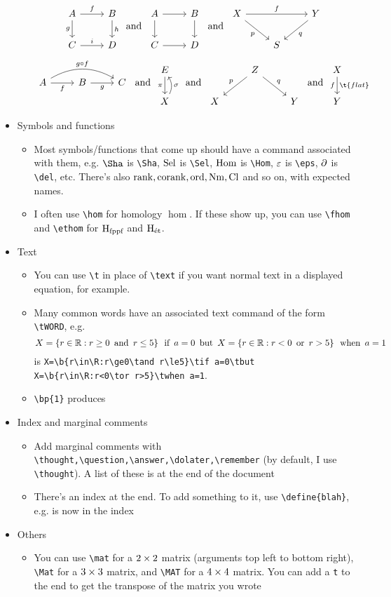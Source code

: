 \documentclass{article}
\numberwithin{thm}{section}
\numberwithin{prob}{section}
\numberwithin{equation}{section}
\begin{document}
\begin{itemize}
\begin{itemize}
        $$\commsquare AfBghCiD\tand\barecommsquare ABCD\tand\mapover XfYpqS$$
        $$\compdiag AfBgC{g\circ f}\tand\mapwithsect E\pi X\sigma\tand\correspondence ZpqXY\tand\mapdown Xf{\t{flat}}Y$$
    \end{itemize}
    \item Symbols and functions
    \begin{itemize}
        \item Most symbols/functions that come up should have a command associated with them, e.g. $\Sha$ is \verb+\Sha+, $\operatorname{Sel}$ is \verb+\Sel+, $\operatorname{Hom}$ is \verb+\Hom+, $\varepsilon$ is \verb+\eps+, $\partial$ is \verb+\del+, etc. There's also $\operatorname{rank},\operatorname{corank},\operatorname{ord},\operatorname{Nm},\operatorname{Cl}$ and so on, with expected names.
        \item I often use \verb+\hom+ for homology $\hom$. If these show up, you can use \verb+\fhom+ and \verb+\ethom+ for $\operatorname H_{\text{fppf}}$ and $\operatorname H_{\text{\'et}}$.
    \end{itemize}
    \item Text
    \begin{itemize}
        \item You can use \verb+\t+ in place of \verb+\text+ if you want normal text in a displayed equation, for example.
        \item Many common words have an associated text command of the form \verb+\tWORD+, e.g.
        $$X=\left\{r\in\mathbb R:r\ge0\,\text{ and }\, r\le5\right\}\,\text{ if }\, a=0\,\text{ but }\, X=\left\{r\in\mathbb R:r<0\,\text{ or }\, r>5\right\}\,\text{ when }\, a=1$$
        is \verb|X=\b{r\in\R:r\ge0\tand r\le5}\tif a=0\tbut X=\b{r\in\R:r<0\tor r>5}\twhen a=1|.
        \item \verb+\bp{1}+ produces 
    \end{itemize}
    \item Index and marginal comments
    \begin{itemize}
        \item Add marginal comments with \verb+\thought,\question,\answer,\dolater,\remember+ (by default, I use \verb+\thought+). A list of these is at the end of the document
        \item There's an index at the end. To add something to it, use \verb+\define{blah}+, e.g.  is now in the index
    \end{itemize}
    \item Others
    \begin{itemize}
        \item You can use \verb+\mat+ for a $2\times2$ matrix (arguments top left to bottom right), \verb+\Mat+ for a $3\times3$ matrix, and \verb+\MAT+ for a $4\times4$ matrix. You can add a \verb+t+ to the end to get the transpose of the matrix you wrote

\end{itemize}
\end{itemize}
\end{document}
